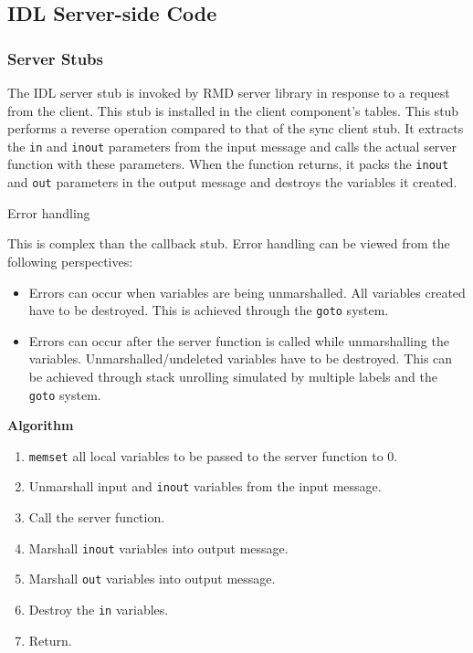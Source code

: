 \begin{flushleft}
\subsection{IDL Server-side Code}

\subsubsection{Server Stubs}

The IDL server stub is invoked by RMD server library in response to a request from the client. This stub is installed in the client component's tables.
This stub performs a reverse operation compared to that of the sync client stub. It extracts the {\tt{in}} and {\tt{inout}} parameters from the input message and calls 
the actual server function with these parameters. When the function returns, it packs the {\tt{inout}} and {\tt{out}} parameters in the output message and destroys the 
variables it created.

\begin{Desc}
\item
[Error handling]
\end{Desc}

This is complex than the callback stub. Error handling can be viewed from the following perspectives:
\begin{itemize}
\item
Errors can occur when variables are being unmarshalled. All variables created have to be destroyed. This is achieved through the 
{\tt{goto}} system.
\item
Errors can occur after the server function is called while unmarshalling the variables. Unmarshalled/undeleted variables
have to be destroyed. This can be achieved through stack unrolling simulated by multiple labels and the {\tt{goto}} system.
\end{itemize}

\textbf{Algorithm}
\begin{enumerate}
\item
{\tt{memset}} all local variables to be passed to the server function to 0.
\item
Unmarshall input and {\tt{inout}} variables from the input message.
\item
Call the server function.
\item
Marshall {\tt{inout}} variables into output message.
\item
Marshall {\tt{out}} variables into output message.
\item
Destroy the {\tt{in}} variables.
\item
Return.


\end{enumerate}
\end{flushleft}
